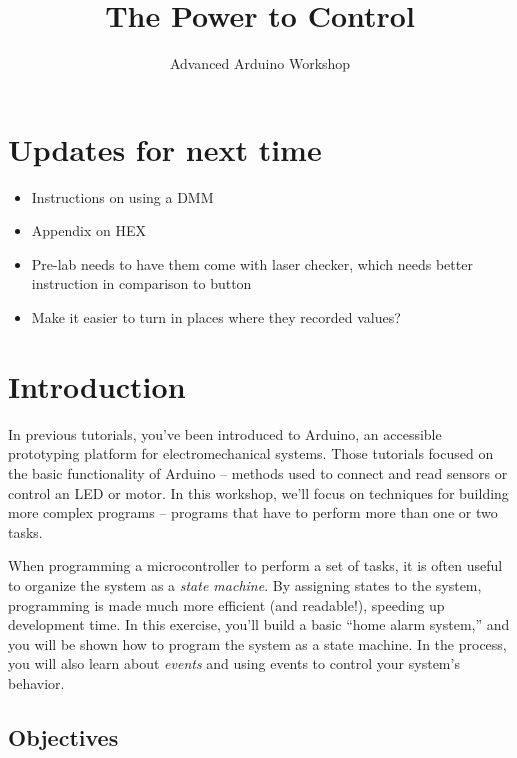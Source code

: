 \documentclass[11pt]{article} %
\title{The Power to Control}
\author{Advanced Arduino Workshop}
\date{} %
\begin{document}
\maketitle


\section*{Updates for next time}

\begin{itemize}
    \item Instructions on using a DMM
    \item Appendix on HEX
    \item Pre-lab needs to have them come with laser checker, which needs better instruction in comparison to button
    \item Make it easier to turn in places where they recorded values?
\end{itemize}
\section*{Introduction}

In previous tutorials, you've been introduced to Arduino, an accessible prototyping platform for electromechanical systems. Those tutorials focused on the basic functionality of Arduino -- methods used to connect and read sensors or control an LED or motor. In this workshop, we'll focus on techniques for building more complex programs -- programs that have to perform more than one or two tasks.

When programming a microcontroller to perform a set of tasks, it is often useful to organize the system as a \emph{state machine}. By assigning states to the system, programming is made much more efficient (and readable!), speeding up development time. In this exercise, you’ll build a basic “home alarm system,” and you will be shown how to program the system as a state machine. In the process, you will also learn about \emph{events} and using events to control your system's behavior.

\subsection*{Objectives}
\end{document}
